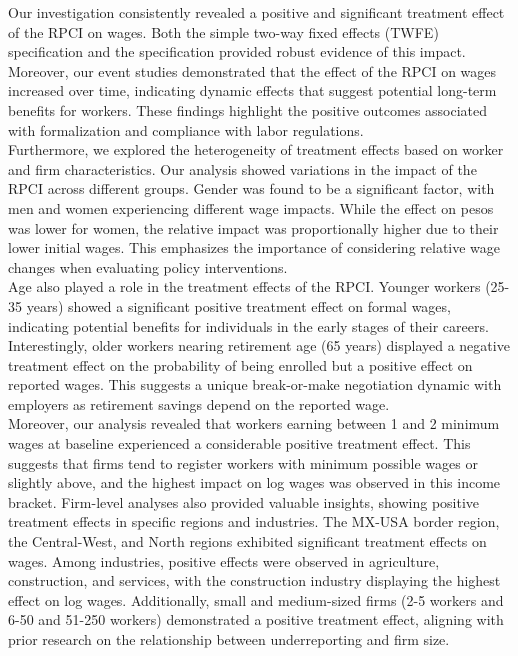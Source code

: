 \documentclass[10pt, oneside]{book}
\begin{document}
Our investigation consistently revealed a positive and significant treatment effect of the RPCI on wages. Both the simple two-way fixed effects (TWFE) specification and the \cite{de2020two} specification provided robust evidence of this impact. Moreover, our event studies demonstrated that the effect of the RPCI on wages increased over time, indicating dynamic effects that suggest potential long-term benefits for workers. These findings highlight the positive outcomes associated with formalization and compliance with labor regulations. \\

Furthermore, we explored the heterogeneity of treatment effects based on worker and firm characteristics. Our analysis showed variations in the impact of the RPCI across different groups. Gender was found to be a significant factor, with men and women experiencing different wage impacts. While the effect on pesos was lower for women, the relative impact was proportionally higher due to their lower initial wages. This emphasizes the importance of considering relative wage changes when evaluating policy interventions. \\

Age also played a role in the treatment effects of the RPCI. Younger workers (25-35 years) showed a significant positive treatment effect on formal wages, indicating potential benefits for individuals in the early stages of their careers. Interestingly, older workers nearing retirement age (65 years) displayed a negative treatment effect on the probability of being enrolled but a positive effect on reported wages. This suggests a unique break-or-make negotiation dynamic with employers as retirement savings depend on the reported wage. \\

Moreover, our analysis revealed that workers earning between 1 and 2 minimum wages at baseline experienced a considerable positive treatment effect. This suggests that firms tend to register workers with minimum possible wages or slightly above, and the highest impact on log wages was observed in this income bracket. Firm-level analyses also provided valuable insights, showing positive treatment effects in specific regions and industries. The MX-USA border region, the Central-West, and North regions exhibited significant treatment effects on wages. Among industries, positive effects were observed in agriculture, construction, and services, with the construction industry displaying the highest effect on log wages. Additionally, small and medium-sized firms (2-5 workers and 6-50 and 51-250 workers) demonstrated a positive treatment effect, aligning with prior research on the relationship between underreporting and firm size. \\
\end{document}
